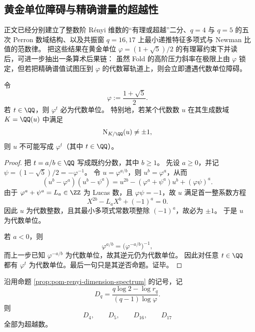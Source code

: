 \subsection{黄金单位障碍与精确谱量的超越性}

正文已经分别建立了整数阶 Rényi 维数的“有理或超越”二分、\(q=4\) 与
\(q=5\) 的五次 Perron 数域结构、以及共振窗 \(q=16,17\) 上最小递推特征多项式与 Newman 比值的范数律。
把这些结果在黄金单位 \(\varphi=(1+\sqrt5)/2\) 的有理幂约束下并读后，可进一步抽出一条算术后果链：
虽然 Fold 的高阶压力斜率在极限上由 \(\varphi\) 锁定，但若把精确谱值试图压到 \(\varphi\) 的代数幂轨道上，则会立即遭遇代数单位障碍。

\begin{theorem}[黄金单位的有理幂障碍]\label{thm:derived-fold-golden-rational-power-unit-obstruction}
令
\[
\varphi:=\frac{1+\sqrt5}{2}.
\]
若 \(t\in\QQ\)，则 \(\varphi^t\) 必为代数单位。
特别地，若某个代数数 \(u\) 在其生成数域 \(K=\QQ(u)\) 中满足
\[
\mathrm N_{K/\QQ}(u)\neq \pm 1,
\]
则 \(u\) 不可能写成 \(\varphi^t\)（其中 \(t\in\QQ\)）。
\end{theorem}

\begin{proof}
把 \(t=a/b\in\QQ\) 写成既约分数，其中 \(b\ge 1\)。
先设 \(a\ge 0\)，并记 \(\psi=(1-\sqrt5)/2=-\varphi^{-1}\)。
令 \(u=\varphi^{a/b}\)，则 \(u^b=\varphi^a\)，从而
\[
(u^b-\varphi^a)(u^b-\psi^a)
=
u^{2b}-(\varphi^a+\psi^a)u^b+(\varphi\psi)^a.
\]
由于 \(\varphi^a+\psi^a=L_a\in\ZZ\) 为 Lucas 数，且 \(\varphi\psi=-1\)，故 \(u\) 满足首一整系数方程
\[
X^{2b}-L_aX^b+(-1)^a=0.
\]
因此 \(u\) 为代数整数，且其最小多项式常数项整除 \((-1)^a\)，故必为 \(\pm1\)。
于是 \(u\) 为代数单位。

若 \(a<0\)，则
\[
\varphi^{a/b}=\bigl(\varphi^{-a/b}\bigr)^{-1},
\]
而上一步已知 \(\varphi^{-a/b}\) 为代数单位，故其逆元仍为代数单位。
因此对任意 \(t\in\QQ\) 都有 \(\varphi^t\) 为代数单位。最后一句只是其逆否命题。证毕。
\end{proof}

\begin{theorem}\label{thm:derived-fold-renyi-dimension-transcendence-q4-q5-q16-q17}
沿用命题 \ref{prop:pom-renyi-dimension-spectrum} 的记号，记
\[
D_q=\frac{q\log 2-\log r_q}{(q-1)\log\varphi}.
\]
则
\[
D_4,\qquad D_5,\qquad D_{16},\qquad D_{17}
\]
全部为超越数。
\end{theorem}

